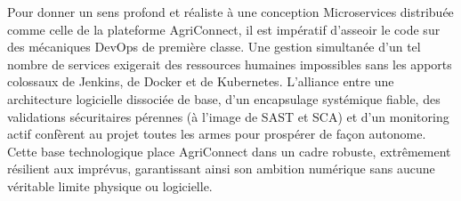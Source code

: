 \documentclass[12pt,a4paper]{article}
\begin{document}
Pour donner un sens profond et réaliste à une conception Microservices distribuée comme celle de la plateforme AgriConnect, il est impératif d'asseoir le code sur des mécaniques DevOps de première classe. Une gestion simultanée d'un tel nombre de services exigerait des ressources humaines impossibles sans les apports colossaux de Jenkins, de Docker et de Kubernetes. L'alliance entre une architecture logicielle dissociée de base, d'un encapsulage systémique fiable, des validations sécuritaires pérennes (à l'image de SAST et SCA) et d'un monitoring actif confèrent au projet toutes les armes pour prospérer de façon autonome. Cette base technologique place AgriConnect dans un cadre robuste, extrêmement résilient aux imprévus, garantissant ainsi son ambition numérique sans aucune véritable limite physique ou logicielle.
\end{document}
